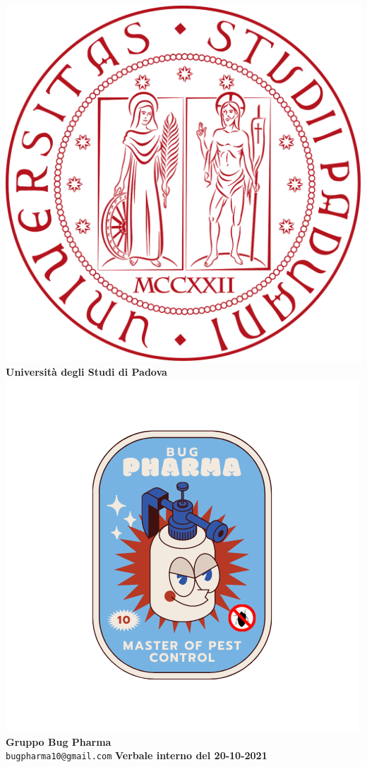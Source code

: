 \documentclass[11pt]{article}
\begin{document}
	\thispagestyle{empty}
	\begin{titlepage}
		\begin{center}
			\includegraphics[scale = 0.05]{../../Res/logo_unipd.png}\\
			\bigskip
			\large \textbf{Università degli Studi di Padova} \\
			\vfill
			\includegraphics[scale = 0.7]{../../Res/BugPharma_Logo.png}\\
			\huge \textbf{Gruppo Bug Pharma} \\
			\vfill
			\large \texttt{bugpharma10@gmail.com}
			\vfill
			\Huge \textbf{Verbale interno del 20-10-2021}\\
			

\end{center}
\end{titlepage}
\end{document}

